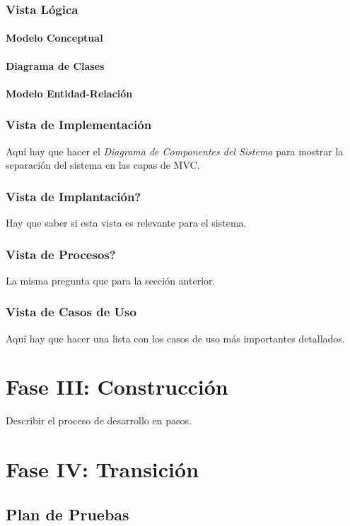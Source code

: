 \subsubsection{Vista Lógica}
\paragraph{Modelo Conceptual}
\paragraph{Diagrama de Clases}
\paragraph{Modelo Entidad-Relación}

\subsubsection{Vista de Implementación}
Aquí hay que hacer el \textit{Diagrama de Componentes del Sistema} para mostrar la separación del sistema en las capas de MVC.
\subsubsection{Vista de Implantación?}
Hay que saber si esta vista es relevante para el sistema.
\subsubsection{Vista de Procesos?}
La misma pregunta que para la sección anterior.
\subsubsection{Vista de Casos de Uso}
Aquí hay que hacer una lista con los casos de uso más importantes detallados.

\section{Fase III: Construcción}
Describir el proceso de desarrollo en pasos.

\section{Fase IV: Transición}
\subsection{Plan de Pruebas}